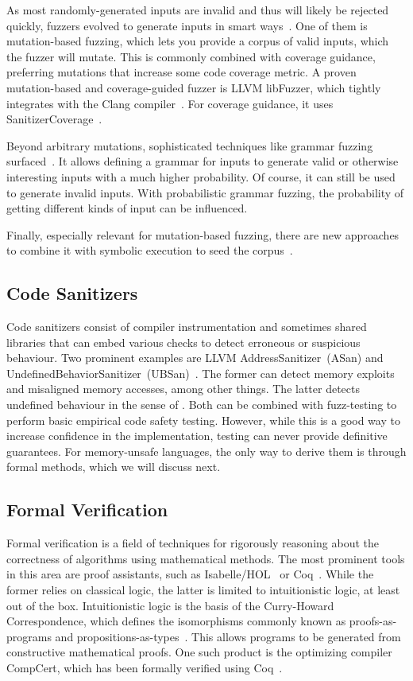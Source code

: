 As most randomly-generated inputs are invalid and thus will likely be rejected quickly, fuzzers evolved to generate inputs in smart ways~\cite{fuzzingbook2023}. One of them is mutation-based fuzzing, which lets you provide a corpus of valid inputs, which the fuzzer will mutate. This is commonly combined with coverage guidance, preferring mutations that increase some code coverage metric. A proven mutation-based and coverage-guided fuzzer is LLVM libFuzzer, which tightly integrates with the Clang compiler~\cite{libfuzzer}. For coverage guidance, it uses SanitizerCoverage~\cite{sanitizer-cov}.

Beyond arbitrary mutations, sophisticated techniques like grammar fuzzing surfaced~\cite{fuzzingbook2023}. It allows defining a grammar for inputs to generate valid or otherwise interesting inputs with a much higher probability. Of course, it can still be used to generate invalid inputs. With probabilistic grammar fuzzing, the probability of getting different kinds of input can be influenced.

Finally, especially relevant for mutation-based fuzzing, there are new approaches to combine it with symbolic execution to seed the corpus~\cite{10.1145/3183440.3183494,9394032}.

\subsection{Code Sanitizers}

Code sanitizers consist of compiler instrumentation and sometimes shared libraries that can embed various checks to detect erroneous or suspicious behaviour. Two prominent examples are LLVM AddressSanitizer~(ASan) and UndefinedBehaviorSanitizer~(UBSan)~\cite{asan,ubsan}. The former can detect memory exploits and misaligned memory accesses, among other things. The latter detects undefined behaviour in the sense of . Both can be combined with \gls{fuzz-testing} to perform basic empirical code safety testing. However, while this is a good way to increase confidence in the implementation, testing can never provide definitive guarantees. For memory-unsafe languages, the only way to derive them is through formal methods, which we will discuss next.

\subsection{Formal Verification}

Formal verification is a field of techniques for rigorously reasoning about the correctness of algorithms using mathematical methods. The most prominent tools in this area are proof assistants, such as Isabelle/HOL~\cite{isabelle} or Coq~\cite{coq}. While the former relies on classical logic, the latter is limited to intuitionistic logic, at least out of the box. Intuitionistic logic is the basis of the Curry-Howard Correspondence, which defines the isomorphisms commonly known as proofs-as-programs and propositions-as-types~\cite{sorensen2006lectures}. This allows programs to be generated from constructive mathematical proofs. One such product is the optimizing  compiler CompCert, which has been formally verified using Coq~\cite{compcert}.

